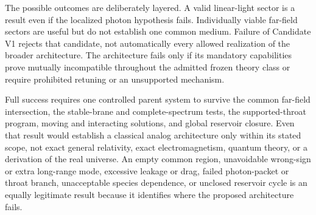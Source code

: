 The possible outcomes are deliberately layered. A valid linear-light sector is a
result even if the localized photon hypothesis fails. Individually viable
far-field sectors are useful but do not establish one common medium. Failure of
Candidate V1 rejects that candidate, not automatically every allowed realization
of the broader architecture. The architecture fails only if its mandatory
capabilities prove mutually incompatible throughout the admitted frozen theory
class or require prohibited retuning or an unsupported mechanism.

Full success requires one controlled parent system to survive the common
far-field intersection, the stable-brane and complete-spectrum tests, the
supported-throat program, moving and interacting solutions, and global reservoir
closure. Even that result would establish a
classical analog architecture only within its stated scope, not exact general
relativity, exact electromagnetism, quantum theory, or a derivation of the real
universe. An empty common region, unavoidable wrong-sign or extra long-range mode,
excessive leakage or drag, failed photon-packet or throat branch, unacceptable
species dependence, or unclosed reservoir cycle is an equally legitimate result
because it identifies where the proposed architecture fails.
